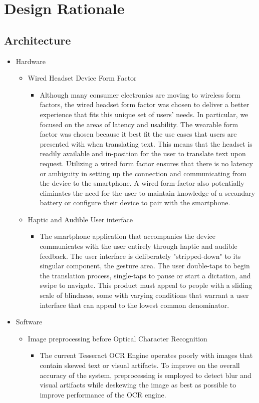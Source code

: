 \chapter{Design Rationale}

	\section{Architecture}
		\begin{itemize}
			\item Hardware
			\begin{itemize}
				\item Wired Headset Device Form Factor
				\begin{itemize}
					\item Although many consumer electronics are moving to wireless form factors, the wired headset form factor was chosen to deliver a better experience that fits this unique set of users' needs. In particular, we focused on the areas of latency and usability. The wearable form factor was chosen because it best fit the use cases that users are presented with when translating text. This means that the headset is readily available and in-position for the user to translate text upon request. Utilizing a wired form factor ensures that there is no latency or ambiguity in setting up the connection and communicating from the device to the smartphone. A wired form-factor also potentially eliminates the need for the user to maintain knowledge of a secondary battery or configure their device to pair with the smartphone.
				\end{itemize}
				\item Haptic and Audible User interface
				\begin{itemize}
					\item The smartphone application that accompanies the device communicates with the user entirely through haptic and audible feedback. The user interface is deliberately "stripped-down" to its singular component, the gesture area. The user double-taps to begin the translation process, single-taps to pause or start a dictation, and swipe to navigate. This product must appeal to people with a sliding scale of blindness, some with varying conditions that warrant a user interface that can appeal to the lowest common denominator.
				\end{itemize}
			\end{itemize}


			\item Software
			\begin{itemize}
				\item Image preprocessing before Optical Character Recognition
				\begin{itemize}
					\item The current Tesseract OCR Engine operates poorly with images that contain skewed text or visual artifacts. To improve on the overall accuracy of the system, preprocessing is employed to detect blur and visual artifacts while deskewing the image as best as possible to improve performance of the OCR engine.
				\end{itemize}
			\end{itemize}
		\end{itemize}
\pagebreak


